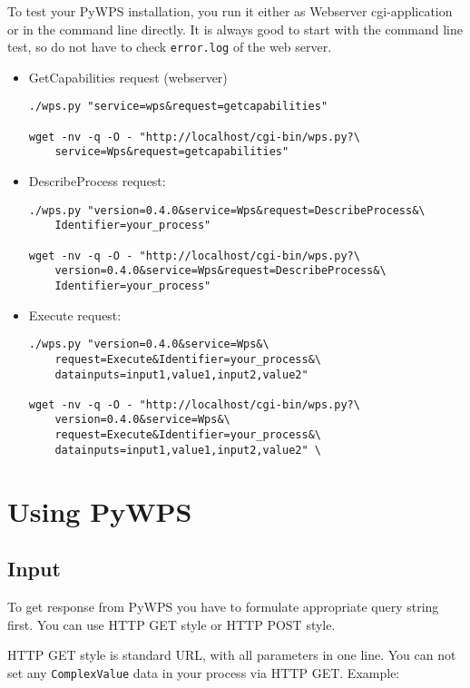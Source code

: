 \documentclass[a4paper,11pt]{article}
\begin{document}
To test your PyWPS installation, you run it either as Webserver
cgi-application or in the command line directly. It is always good to start
with the command line test, so do not have to check \texttt{error.log} of
the web server.

\begin{itemize}
    \item GetCapabilities request (webserver)
\begin{verbatim}
./wps.py "service=wps&request=getcapabilities"

wget -nv -q -O - "http://localhost/cgi-bin/wps.py?\
    service=Wps&request=getcapabilities"
\end{verbatim}
        
    \item DescribeProcess request:
\begin{verbatim}
./wps.py "version=0.4.0&service=Wps&request=DescribeProcess&\
    Identifier=your_process"

wget -nv -q -O - "http://localhost/cgi-bin/wps.py?\
    version=0.4.0&service=Wps&request=DescribeProcess&\
    Identifier=your_process"
\end{verbatim}
        
    \item Execute request:
\begin{verbatim}
./wps.py "version=0.4.0&service=Wps&\
    request=Execute&Identifier=your_process&\
    datainputs=input1,value1,input2,value2"

wget -nv -q -O - "http://localhost/cgi-bin/wps.py?\
    version=0.4.0&service=Wps&\
    request=Execute&Identifier=your_process&\
    datainputs=input1,value1,input2,value2" \
\end{verbatim}
        
\end{itemize}


\section{Using PyWPS}
\subsection{Input}
    
To get response from PyWPS you have to formulate appropriate query string first. You can use HTTP GET style or HTTP POST style.
    
    
HTTP GET style is standard URL, with all parameters in one line. You can not set any \texttt{ComplexValue} data in your process via HTTP GET. Example:
    
\end{document}
